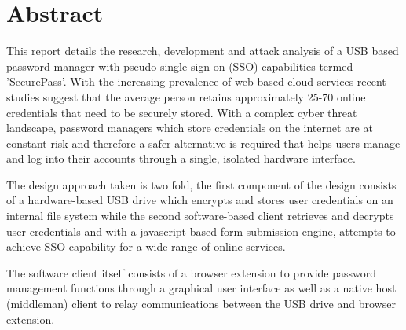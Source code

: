 \section{Abstract}

This report details the research, development and attack analysis of a USB based password manager with pseudo single sign-on (SSO) capabilities termed 'SecurePass'. With the increasing prevalence of web-based cloud services recent studies suggest that the average person retains approximately 25-70 online credentials that need to be securely stored. With a complex cyber threat landscape, password managers which store credentials on the internet are at constant risk and therefore a safer alternative is required that helps users manage and log into their accounts through a single, isolated hardware interface.

The design approach taken is two fold, the first component of the design consists of a hardware-based USB drive which encrypts and stores user credentials on an internal file system while the second software-based client retrieves and decrypts user credentials and with a javascript based form submission engine, attempts to achieve SSO capability for a wide range of online services.

The software client itself consists of a browser extension to provide password management functions through a graphical user interface as well as a native host (middleman) client to relay communications between the USB drive and browser extension.

